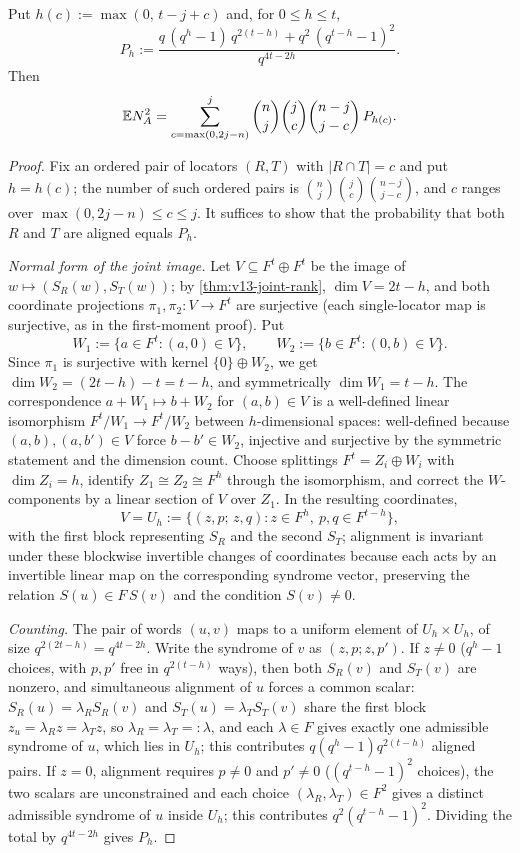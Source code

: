 \begin{theorem}\label{thm:v13-second-moment}
Put $h(c):=\max(0,\,t-j+c)$ and, for $0\le h\le t$,
\[
P_h:=
\frac{q\,(q^h-1)\,q^{2(t-h)}+q^2\,(q^{t-h}-1)^2}{q^{4t-2h}} .
\]
Then
\[
\mathbb E N_A^2
=
\sum_{c=\max(0,2j-n)}^{j}
\binom{n}{j}\binom{j}{c}\binom{n-j}{j-c}\,
P_{h(c)} .
\]
\end{theorem}

\begin{proof}
Fix an ordered pair of locators $(R,T)$ with $|R\cap T|=c$ and put $h=h(c)$; the number of such ordered pairs is $\binom nj\binom jc\binom{n-j}{j-c}$, and $c$ ranges over $\max(0,2j-n)\le c\le j$.  It suffices to show that the probability that both $R$ and $T$ are aligned equals $P_h$.

\emph{Normal form of the joint image.}  Let $V\subseteq F^t\oplus F^t$ be the image of $w\mapsto(S_R(w),S_T(w))$; by \cref{thm:v13-joint-rank}, $\dim V=2t-h$, and both coordinate projections $\pi_1,\pi_2:V\to F^t$ are surjective \textup(each single-locator map is surjective, as in the first-moment proof\textup).  Put
\[
        W_1:=\{a\in F^t:(a,0)\in V\},
        \qquad
        W_2:=\{b\in F^t:(0,b)\in V\}.
\]
Since $\pi_1$ is surjective with kernel $\{0\}\oplus W_2$, we get $\dim W_2=(2t-h)-t=t-h$, and symmetrically $\dim W_1=t-h$.  The correspondence $a+W_1\mapsto b+W_2$ for $(a,b)\in V$ is a well-defined linear isomorphism $F^t/W_1\to F^t/W_2$ between $h$-dimensional spaces: well-defined because $(a,b),(a,b')\in V$ force $b-b'\in W_2$, injective and surjective by the symmetric statement and the dimension count.  Choose splittings $F^t=Z_i\oplus W_i$ with $\dim Z_i=h$, identify $Z_1\cong Z_2\cong F^h$ through the isomorphism, and correct the $W$-components by a linear section of $V$ over $Z_1$.  In the resulting coordinates,
\[
        V=U_h:=\{(z,p;\,z,q):z\in F^h,\ p,q\in F^{t-h}\},
\]
with the first block representing $S_R$ and the second $S_T$; alignment is invariant under these blockwise invertible changes of coordinates because each acts by an invertible linear map on the corresponding syndrome vector, preserving the relation $S(u)\in F\,S(v)$ and the condition $S(v)\ne0$.

\emph{Counting.}  The pair of words $(u,v)$ maps to a uniform element of $U_h\times U_h$, of size $q^{2(2t-h)}=q^{4t-2h}$.  Write the syndrome of $v$ as $(z,p;z,p')$.  If $z\ne0$ \textup($q^h-1$ choices, with $p,p'$ free in $q^{2(t-h)}$ ways\textup), then both $S_R(v)$ and $S_T(v)$ are nonzero, and simultaneous alignment of $u$ forces a common scalar: $S_R(u)=\lambda_R S_R(v)$ and $S_T(u)=\lambda_T S_T(v)$ share the first block $z_u=\lambda_Rz=\lambda_Tz$, so $\lambda_R=\lambda_T=:\lambda$, and each $\lambda\in F$ gives exactly one admissible syndrome of $u$, which lies in $U_h$; this contributes $q(q^h-1)q^{2(t-h)}$ aligned pairs.  If $z=0$, alignment requires $p\ne0$ and $p'\ne0$ \textup($(q^{t-h}-1)^2$ choices\textup), the two scalars are unconstrained and each choice $(\lambda_R,\lambda_T)\in F^2$ gives a distinct admissible syndrome of $u$ inside $U_h$; this contributes $q^2(q^{t-h}-1)^2$.  Dividing the total by $q^{4t-2h}$ gives $P_h$.
\end{proof}

